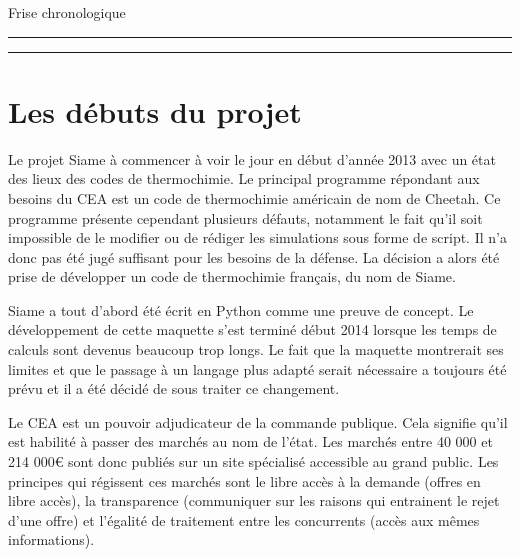 \begin{table}[h]
\caption{Frise chronologique}
\label{chrono}
\centering
\begin{minipage}[t]{.7\linewidth}
\color{gray}
\rule{\linewidth}{1pt}




\rule{\linewidth}{1pt}%
\end{minipage}%
\end{table}


\section{Les débuts du projet}

Le projet Siame à commencer à voir le jour en début d'année 2013 avec un état des lieux des codes de thermochimie. Le principal programme répondant aux besoins du CEA est un code de thermochimie américain de nom de Cheetah. Ce programme présente cependant plusieurs défauts, notamment le fait qu'il soit impossible de le modifier ou de rédiger les simulations sous forme de script. Il n'a donc pas été jugé suffisant pour les besoins de la défense. La décision a alors été prise de développer un code de thermochimie français, du nom de Siame.

Siame a tout d'abord été écrit en Python comme une preuve de concept. Le développement de cette maquette s'est terminé début 2014 lorsque les temps de calculs sont devenus beaucoup trop longs. Le fait que la maquette montrerait ses limites et que le passage à un langage plus adapté serait nécessaire a toujours été prévu et il a été décidé de sous traiter ce changement. 

Le CEA est un pouvoir adjudicateur de la commande publique. Cela signifie qu'il est habilité à passer des marchés au nom de l'état. Les marchés entre 40 000 et 214 000€ sont donc publiés sur un site spécialisé accessible au grand public. Les principes qui régissent ces marchés sont le libre accès à la demande (offres en libre accès), la transparence (communiquer sur les raisons qui entrainent le rejet d'une offre) et l'égalité de traitement entre les concurrents (accès aux mêmes informations).


